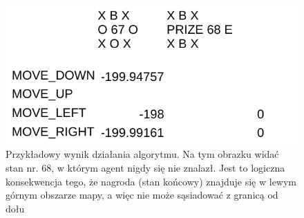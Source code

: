 \begin{figure}[H]
    \centering
    \includegraphics[scale=0.7]{wynik3}
    \caption{Przykładowy wynik działania algorytmu. Na tym obrazku widać stan nr. 68, w którym agent nigdy się nie 
znalazł. Jest to logiczna konsekwencja tego, że nagroda (stan końcowy) znajduje się w lewym górnym obszarze mapy, a 
więc nie może sąsiadować z granicą od dołu}
    \label{fig:wynik3}
\end{figure}

















